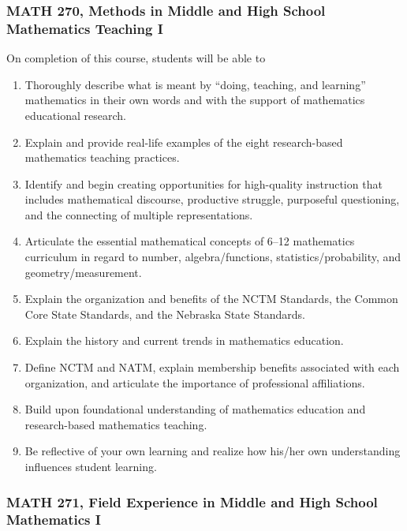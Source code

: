 \documentclass[11pt]{article}
\newenvironment{alphalist}{
\begin{enumerate}[label=(\arabic*),widest=107 ,leftmargin=25pt, itemsep=0pt]}
{\end{enumerate}}
\begin{document}
\subsubsection*{MATH 270, Methods in Middle and High School Mathematics Teaching I}

On completion of this course, students will be able to
\begin{alphalist}
\item Thoroughly describe what is meant by ``doing, teaching, and learning'' mathematics in their own words and with the support of mathematics educational research.
\item Explain and provide real-life examples of the eight research-based mathematics teaching practices.
\item Identify and begin creating opportunities for high-quality instruction that includes mathematical discourse, productive struggle, purposeful questioning, and the connecting of multiple representations.
\item Articulate the essential mathematical concepts of 6--12 mathematics curriculum in regard to number, algebra/functions, statistics/probability, and geometry/measurement.
\item Explain the organization and benefits of the NCTM Standards, the Common Core State Standards, and the Nebraska State Standards.
\item Explain the history and current trends in mathematics education.
\item Define NCTM and NATM, explain membership benefits associated with each organization, and articulate the importance of professional affiliations.
\item Build upon foundational understanding of mathematics education and research-based mathematics teaching.
\item Be reflective of your own learning and realize how his/her own understanding influences student learning.
\end{alphalist}

\subsubsection*{MATH 271, Field Experience in Middle and High School Mathematics I}
\end{document}

